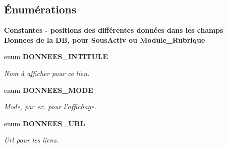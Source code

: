\subsection*{Énumérations}
\begin{Indent}{\bf Constantes - positions des différentes données dans les champs Donnees de la DB, pour SousActiv ou Module\_\-Rubrique}\par
\begin{CompactItemize}
\item 
enum {\bf DONNEES\_\-INTITULE} 
\begin{CompactList}\small\item\em Nom à afficher pour ce lien. \item\end{CompactList}\item 
enum {\bf DONNEES\_\-MODE} 
\begin{CompactList}\small\item\em Mode, par ex. pour l'affichage. \item\end{CompactList}\item 
enum {\bf DONNEES\_\-URL} 
\begin{CompactList}\small\item\em Url pour les liens. \item\end{CompactList}\end{CompactItemize}
\end{Indent}
